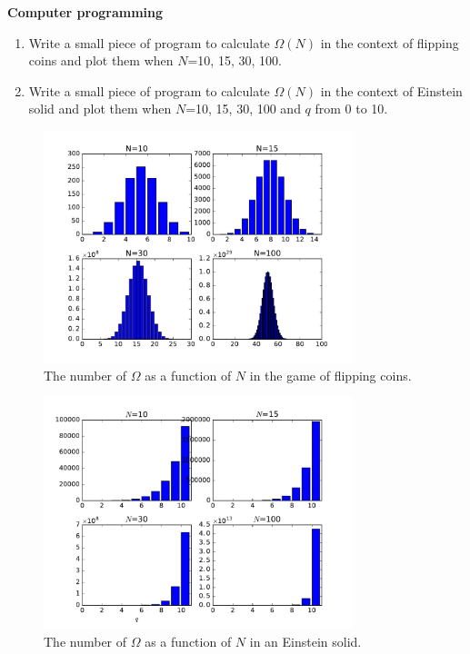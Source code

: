 {\bf Computer programming}
\begin{enumerate}
\item Write a small piece of program to calculate $\Omega(N)$ in the context of flipping coins and plot them when $N$=10, 15, 30, 100.
\item Write a small piece of program to calculate $\Omega(N)$ in the context of Einstein solid and plot them when $N$=10, 15, 30, 100 and $q$ from 0 to 10.
\end{enumerate}

\begin{figure}[h]
\centering
\includegraphics[width=9cm]{imgs/flip}
\caption{The number of $\Omega$ as a function of $N$ in the game of flipping coins. }
\end{figure}

\begin{figure}[h]
\centering
\includegraphics[width=9cm]{imgs/Einstein0}
\caption{The number of $\Omega$ as a function of $N$ in an Einstein solid. }
\end{figure}


